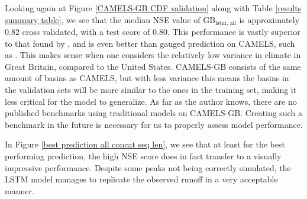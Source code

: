 Looking again at Figure \ref{CAMELS-GB CDF validation} along with Table 
\ref{results summary table}, we see that the median NSE value of GB$_\text{lstm, all}$ 
is approximately $0.82$ cross validated, with a test score of $0.80$. 
This performance is vastly superior to that found by \citet{lstm_third_paper}, and 
is even better than gauged prediction on CAMELS, such as \citet{lstm_second_paper}. 
This makes sense when one considers the relatively low variance in climate in Great 
Britain, compared to the United States. CAMELS-GB consists of the same amount 
of basins as CAMELS, but with less variance this means the basins in the validation 
sets will be more similar to the ones in the training set, making it less critical 
for the model to generalize.
As far as the author knows, there are no published benchmarks using traditional models on 
CAMELS-GB. Creating such a benchmark in the future is necessary for us to properly 
assess model performance.

In Figure \ref{best prediction all concat seq len}, we see that at least for the 
best performing prediction, the high NSE score does 
in fact transfer to a visually impressive performance. Despite some peaks not being 
correctly simulated, the LSTM model manages to replicate the observed runoff in a 
very acceptable manner.

